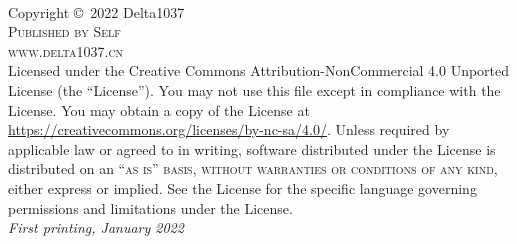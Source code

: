 \documentclass[11pt,fleqn]{book} %
\begin{document}

\begingroup
\thispagestyle{empty} %
\vfill
\endgroup


\newpage
~\vfill
\thispagestyle{empty}

\noindent Copyright \copyright\ 2022 Delta1037\\ %

\noindent \textsc{Published by Self}\\ %

\noindent \textsc{www.delta1037.cn}\\ %

\noindent Licensed under the Creative Commons Attribution-NonCommercial 4.0 Unported License (the ``License''). You may not use this file except in compliance with the License. You may obtain a copy of the License at \url{https://creativecommons.org/licenses/by-nc-sa/4.0/}. Unless required by applicable law or agreed to in writing, software distributed under the License is distributed on an \textsc{``as is'' basis, without warranties or conditions of any kind}, either express or implied. See the License for the specific language governing permissions and limitations under the License.\\ %

\noindent \textit{First printing, January 2022} %
\end{document}
